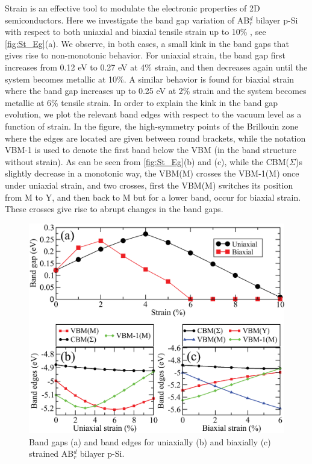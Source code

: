 Strain is an effective tool to modulate the electronic properties of 2D semiconductors. Here we investigate the band gap variation of AB$_r^d$ bilayer p-Si with respect to both uniaxial and biaxial tensile strain up to 10\% , see \autoref{fig:St_Eg}(a). We observe, in both cases, a small kink in the band gaps that gives rise to non-monotonic behavior. For uniaxial strain, the band gap first increases from 0.12 eV to 0.27 eV at 4\% strain, and then decreases again until the system becomes metallic at 10\%. A similar behavior is found for biaxial strain where the band gap increases up to 0.25 eV at 2\% strain and the system becomes metallic at 6\%  tensile strain. In order to explain the kink in the band gap evolution, we plot the relevant band edges with respect to the vacuum level as a function of strain. In the figure, the high-symmetry points of the Brillouin zone where the edges are located are given between round brackets, while the notation VBM-1 is used to denote the first band below the VBM (in the band structure without strain). As can be seen from \autoref{fig:St_Eg}(b) and (c), while the CBM($\Sigma$)s slightly decrease in a monotonic way, the VBM(M) crosses the VBM-1(M) once under uniaxial strain, and two crosses, first the VBM(M) switches its position from M to Y, and then back to M but for a lower band, occur for biaxial strain. These crosses give rise to abrupt changes in the band gaps.

\begin{figure}[htbp]
\includegraphics[width=\linewidth]{ps_bandgap_strain.eps}%
\caption{Band gaps (a) and band edges for uniaxially (b) and biaxially (c) strained AB$_r^d$ bilayer p-Si.\label{fig:St_Eg}}
\end{figure}

